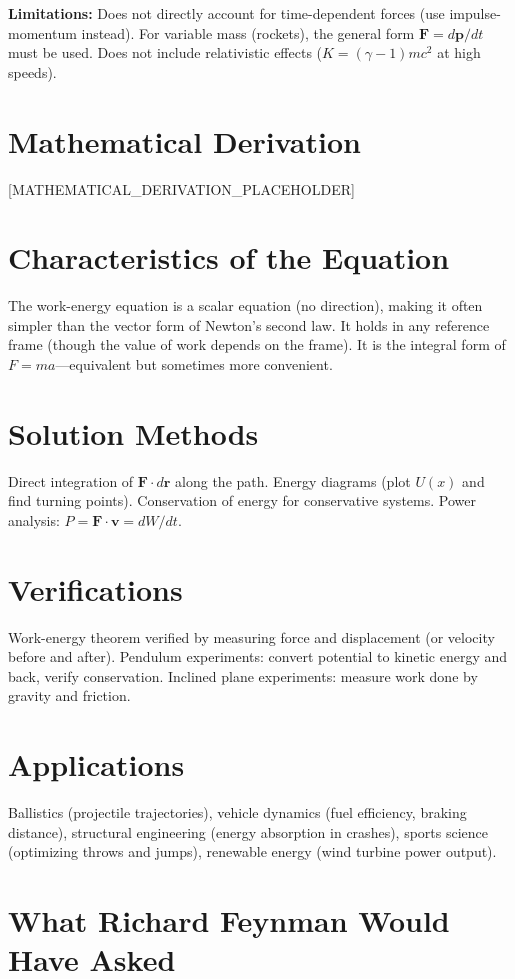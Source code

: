 \documentclass[11pt,openright]{book}
\begin{document}
\textbf{Limitations:} Does not directly account for time-dependent forces (use impulse-momentum instead). For variable mass (rockets), the general form $\mathbf{F} = d\mathbf{p}/dt$ must be used. Does not include relativistic effects ($K = (\gamma - 1)mc^2$ at high speeds).


\section*{Mathematical Derivation}

[MATHEMATICAL_DERIVATION_PLACEHOLDER]

\section*{Characteristics of the Equation}

The work-energy equation is a scalar equation (no direction), making it often simpler than the vector form of Newton's second law. It holds in any reference frame (though the value of work depends on the frame). It is the integral form of $F = ma$---equivalent but sometimes more convenient.
\section*{Solution Methods}

Direct integration of $\mathbf{F} \cdot d\mathbf{r}$ along the path. Energy diagrams (plot $U(x)$ and find turning points). Conservation of energy for conservative systems. Power analysis: $P = \mathbf{F} \cdot \mathbf{v} = dW/dt$.
\section*{Verifications}

Work-energy theorem verified by measuring force and displacement (or velocity before and after). Pendulum experiments: convert potential to kinetic energy and back, verify conservation. Inclined plane experiments: measure work done by gravity and friction.
\section*{Applications}

Ballistics (projectile trajectories), vehicle dynamics (fuel efficiency, braking distance), structural engineering (energy absorption in crashes), sports science (optimizing throws and jumps), renewable energy (wind turbine power output).
\section*{What Richard Feynman Would Have Asked}
\end{document}
